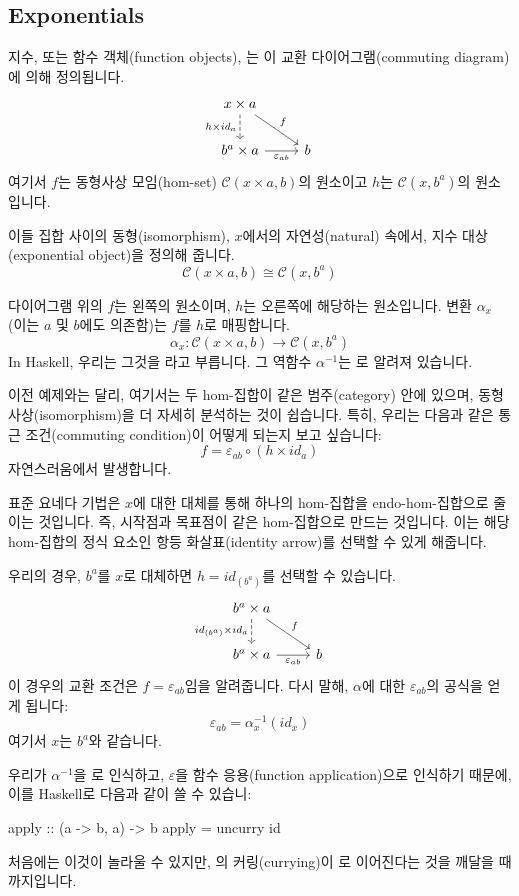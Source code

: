 \documentclass[DaoFP]{subfiles}
\begin{document}
\subsection{Exponentials}

지수, 또는 함수 객체(function objects), 는 이 교환 다이어그램(commuting diagram)에 의해 정의됩니다.
\[
 \begin{tikzcd}
 x \times a
 \arrow[d, dashed, "h \times id_a"']
 \arrow[rd, "f"]
 \\
 b^a \times a
 \arrow[r, "\varepsilon_{a b}"']
& b
 \end{tikzcd}
\]
여기서 $f$는 동형사상 모임(hom-set) $\mathcal{C}(x \times a, b)$의 원소이고 $h$는 $\mathcal{C}(x, b^a)$의 원소입니다.

이들 집합 사이의 동형(isomorphism), $x$에서의 자연성(natural) 속에서, 지수 대상(exponential object)을 정의해 줍니다.
\[\mathcal{C}(x \times a, b) \cong \mathcal{C}(x, b^a)\]

다이어그램 위의 $f$는 왼쪽의 원소이며, $h$는 오른쪽에 해당하는 원소입니다. 변환 $\alpha_x$ (이는 $a$ 및 $b$에도 의존함)는 $f$를 $h$로 매핑합니다.
\[ \alpha_x \colon \mathcal{C}(x \times a, b) \to \mathcal{C}(x, b^a) \]
In Haskell, 우리는 그것을 라고 부릅니다. 그 역함수 $\alpha^{-1}$는 로 알려져 있습니다.

이전 예제와는 달리, 여기서는 두 hom-집합이 같은 범주(category) 안에 있으며, 동형사상(isomorphism)을 더 자세히 분석하는 것이 쉽습니다. 특히, 우리는 다음과 같은 통근 조건(commuting condition)이 어떻게 되는지 보고 싶습니다:
\[  f = \varepsilon_{a b} \circ (h \times id_a) \]
자연스러움에서 발생합니다.

표준 요네다 기법은 $x$에 대한 대체를 통해 하나의 hom-집합을 endo-hom-집합으로 줄이는 것입니다. 즉, 시작점과 목표점이 같은 hom-집합으로 만드는 것입니다. 이는 해당 hom-집합의 정식 요소인 항등 화살표(identity arrow)를 선택할 수 있게 해줍니다.

우리의 경우, $b^a$를 $x$로 대체하면 $h = id_{(b^a)}$를 선택할 수 있습니다.
\[
 \begin{tikzcd}
 b^a \times a
 \arrow[d, dashed, "id_{(b^a)} \times id_a"']
 \arrow[rd, "f"]
 \\
 b^a \times a
 \arrow[r, "\varepsilon_{a b}"']
& b
 \end{tikzcd}
\]
이 경우의 교환 조건은 $f = \varepsilon_{a b}$임을 알려줍니다. 다시 말해, $\alpha$에 대한 $\varepsilon_{a b}$의 공식을 얻게 됩니다:
\[ \varepsilon_{a b} = \alpha_{x}^{-1} (id_{x}) \]
여기서 $x$는 $b^a$와 같습니다.

우리가 $\alpha^{-1}$을 로 인식하고, $\varepsilon$을 함수 응용(function application)으로 인식하기 때문에, 이를 Haskell로 다음과 같이 쓸 수 있습니:
\begin{haskell}
apply :: (a -> b, a) -> b
apply = uncurry id
\end{haskell}
처음에는 이것이 놀라울 수 있지만, 의 커링(currying)이 로 이어진다는 것을 깨달을 때까지입니다.
\end{document}
